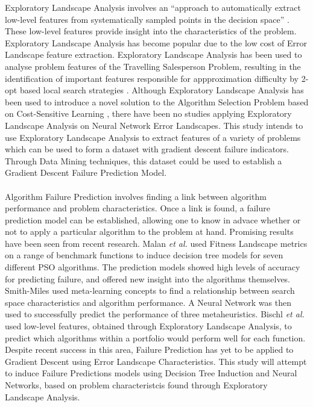 \documentclass[runningheads,a4paper]{llncs}
\begin{document}
Exploratory Landscape Analysis involves an ``approach to automatically extract low-level features from systematically sampled points in the decision space'' \cite{mersmann2011exploratory}. These low-level features provide insight into the characteristics
of the problem. Exploratory Landscape Analysis has become popular due to the low cost of Error Landscape feature extraction. Exploratory Landscape Analysis has been used to analyse problem features of the Travelling Salesperson Problem, resulting in
the identification of important features responsible for appproximation difficulty by 2-opt based local search strategies \cite{mersmann2013novel}. Although Exploratory Landscape Analysis has been used to introduce a novel solution to the 
Algorithm Selection Problem based on Cost-Sensitive Learning \cite{bischl2012algorithm}, there have been no studies applying Exploratory Landscape Analysis on Neural Network Error Landscapes. This study intends to use Exploratory Landscape Analysis to extract 
features of a variety of problems which can be used to form a dataset with gradient descent failure indicators. Through Data Mining techniques, this dataset could be used to establish a Gradient Descent Failure Prediction Model. 
\\\\
Algorithm Failure Prediction involves finding a link between algorithm performance and problem characteristics. Once a link is found, a failure prediction model can be established, allowing one to know in advace whether or not to apply a particular
algorithm to the problem at hand. Promising results have been seen from recent research. Malan \textit{et al.} \cite{malan2014particle} used Fitness Landscape metrics on a range of benchmark functions to induce decision tree models for seven different 
PSO algorithms. The prediction models showed high levels of accuracy for predicting failure, and offered new insight into the algorithms themselves. Smith-Miles \cite{smith2008towards} used meta-learning concepts to find a relationship between search space 
characteristics and algorithm performance. A Neural Network was then used to successfully predict the performance of three metaheuristics. Bischl \textit{et al.} \cite{bischl2012algorithm} used low-level features, obtained through Exploratory Landscape Analysis, to predict which algorithms
within a portfolio would perform well for each function. Despite recent success in this area, Failure Prediction has yet to be applied to Gradient Descent using Error Landscape Characteristics. 
This study will attempt to induce Failure Predictions models using Decision Tree Induction and Neural Networks, based on problem characteristcis found through Exploratory Landscape Analysis.
\end{document}
